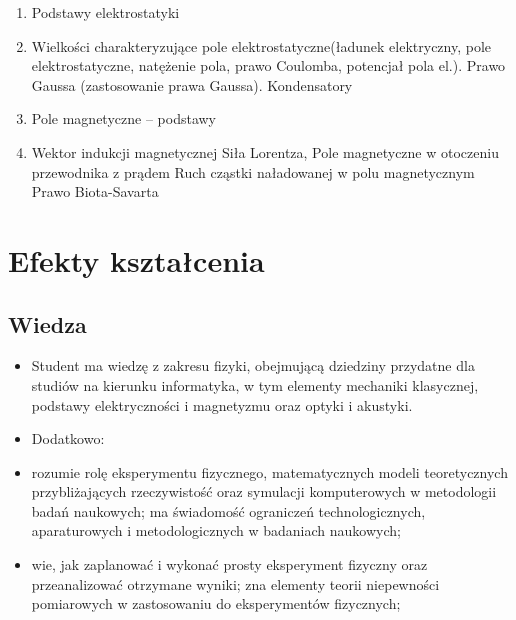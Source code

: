 \documentclass[12pt, a4paper]{article}
\begin{document}
\begin{enumerate}
  \item Podstawy elektrostatyki
  \item Wielkości charakteryzujące pole elektrostatyczne(ładunek elektryczny, pole elektrostatyczne, natężenie pola, prawo Coulomba, potencjał pola el.). Prawo Gaussa (zastosowanie prawa Gaussa). Kondensatory
  \item Pole magnetyczne – podstawy
  \item Wektor indukcji magnetycznej Siła Lorentza, Pole magnetyczne w otoczeniu przewodnika z prądem Ruch cząstki naładowanej w polu magnetycznym Prawo Biota-Savarta
\end{enumerate}

\section{Efekty kształcenia}

\subsection*{Wiedza}
\begin{itemize}
  \item Student ma wiedzę z zakresu fizyki, obejmującą dziedziny przydatne dla studiów na kierunku informatyka, w tym elementy mechaniki klasycznej, podstawy elektryczności i magnetyzmu oraz optyki i akustyki.
  \item Dodatkowo:
  \item rozumie rolę eksperymentu fizycznego, matematycznych modeli teoretycznych przybliżających rzeczywistość oraz symulacji komputerowych w metodologii badań naukowych; ma świadomość ograniczeń technologicznych, aparaturowych i metodologicznych w badaniach naukowych;
  \item wie, jak zaplanować i wykonać prosty eksperyment fizyczny oraz przeanalizować otrzymane wyniki; zna elementy teorii niepewności pomiarowych w zastosowaniu do eksperymentów fizycznych;
\end{itemize}
\end{document}
